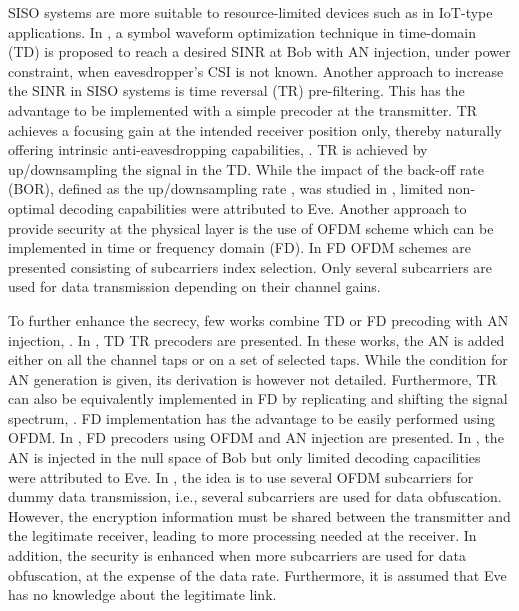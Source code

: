 \documentclass[journal,comsoc]{IEEEtran}
\begin{document}
 SISO systems are more suitable to resource-limited devices such as in IoT-type applications.   In \cite{li2013waveform}, a symbol waveform optimization technique in time-domain (TD) is proposed to reach a desired SINR at Bob with AN injection, under power constraint, when eavesdropper’s CSI is not known. Another approach to increase the SINR in SISO systems is time reversal (TR) pre-filtering. This has the advantage to be implemented with a simple precoder at the transmitter. TR achieves a focusing gain at the intended receiver position only, thereby naturally offering intrinsic anti-eavesdropping capabilities, \cite{9003692,oestges2005characterization}. TR is achieved by up/downsampling the signal in the TD. While the impact of the back-off rate (BOR), defined as the up/downsampling rate \cite{dubois2010use}, was studied in \cite{9003692,9049811}, limited non-optimal decoding capabilities were attributed to Eve. Another approach to provide security at the physical layer is the use of OFDM scheme which can be implemented in time or frequency domain (FD). In \cite{8093595,8093591} FD OFDM schemes are presented consisting of subcarriers index selection. Only several subcarriers are used for data transmission depending on their channel gains.

To further enhance the secrecy, few works combine TD or FD precoding with AN injection, \cite{9049811,xu2018security,li2018artificial,li2017artificial,7475864,7041552}. In \cite{xu2018security,li2018artificial,li2017artificial}, TD TR precoders are presented. In these works, the AN is added either on all the channel taps or on a set of selected taps. While the condition for AN generation is given, its derivation is however not detailed.  Furthermore, TR can also be equivalently implemented in FD by replicating and shifting the signal spectrum, \cite{8883213}. FD implementation has the advantage to be easily performed using OFDM. In \cite{9049811,7475864,7041552}, FD precoders using OFDM and AN injection are presented. In \cite{9049811}, the AN is injected in the null space of Bob but only limited decoding capacilities were attributed to Eve. In \cite{7475864,7041552}, the idea is to use several OFDM subcarriers for dummy data transmission, i.e., several subcarriers are used for data obfuscation. However, the encryption information must be shared between the transmitter and the legitimate receiver, leading to more processing needed at the receiver. In addition, the security is enhanced when more subcarriers are used for data obfuscation, at the expense of the data rate. Furthermore, it is assumed that Eve has no knowledge about the legitimate link.
\end{document}
